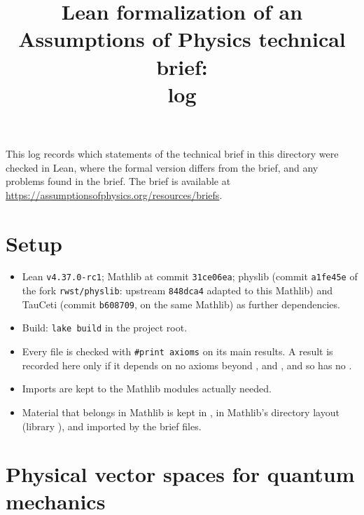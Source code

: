 \documentclass[11pt]{article}
\title{Lean formalization of an Assumptions of Physics technical brief:\\ log}
\author{}
\date{}
\begin{document}
\maketitle

\noindent
This log records which statements of the technical brief in this directory were checked in Lean,
where the formal version differs from the brief, and any problems found in the brief.
The brief is available at \url{https://assumptionsofphysics.org/resources/briefs}.

\section*{Setup}

\begin{itemize}
\item Lean \texttt{v4.37.0-rc1}; Mathlib at commit \texttt{31ce06ea}; physlib (commit \texttt{a1fe45e}
  of the fork \texttt{rwst/physlib}: upstream \texttt{848dca4} adapted to this Mathlib) and
  TauCeti (commit \texttt{b608709}, on the same Mathlib) as further dependencies.
\item Build: \texttt{lake build} in the project root.
\item Every file is checked with \texttt{\#print axioms} on its main results. A result is
  recorded here only if it depends on no axioms beyond ,
   and , and so has no .
\item Imports are kept to the Mathlib modules actually needed.
\item Material that belongs in Mathlib is kept in , in Mathlib's directory
  layout (library ), and imported by the brief files.
\end{itemize}



\section{Physical vector spaces for quantum mechanics}
\end{document}
